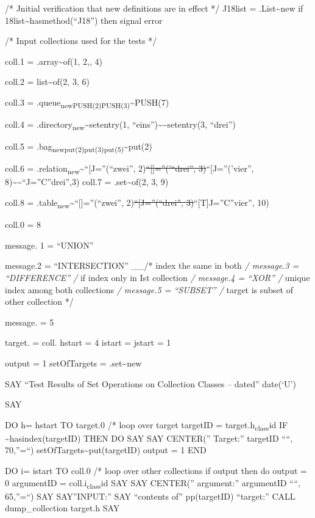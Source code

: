 /* Jnitial verification that new definitions are in effect */ J18list =
.List\textasciitilde new if \J18list\textasciitilde hasmethod(``J18'')
then signal error

/* Input collections used for the tests */

coll.1 = .array\textasciitilde of(1, 2,, 4)

coll.2 = list\textasciitilde of(2, 3, 6)

coll.3 = .queue\textsubscript{newPUSH(2)PUSH(3)}\textasciitilde PUSH(7)

coll.4 = .directory\textsubscript{new}\textasciitilde setentry(1,
``eins'')\textasciitilde\textasciitilde setentry(3, ``drei'')

coll.5 = .bag\textsubscript{newput(2)put(3)put(5)}\textasciitilde put(2)

coll.6 =
.relation\textsubscript{new}\textasciitilde{}``{[}J=''(``zwei'',
2)\st{``{[}{]}=''('``drei'', 3)}``{[}J=''('vier'',
8)\textasciitilde\textasciitilde{}``J=''C''drei'',3) coll.7 =
.set\textasciitilde of(2, 3, 9)

coll.8 = .table\textsubscript{new}\textasciitilde{}``{[}{]}=''(``zwei'',
2)\st{``{[}J=''(``drei'', 3)}``{[}T{]}J=''C''vier'', 10)

coll.0 = 8

message. 1 = ``UNION''

message.2 = ``INTERSECTION'' \_\_/* index the same in both \emph{/
message.3 = ``DIFFERENCE'' /} if index only in Ist collection \emph{/
message.4 = ``XOR'' /} unique index among both collections \emph{/
message.5 = ``SUBSET'' /} target is subset of other collection */

message. = 5

target. = coll. hstart = 4 istart = \textbar{} jstart = 1

output = 1 setOfTargets = .set\textasciitilde new

SAY ``Test Results of Set Operations on Collection Classes -- dated''
date(`U')

SAY

DO h= hstart TO target.0 /* loop over target targetID =
target.h\textsubscript{class}id IF
\setOfTargets\textasciitilde hasindex(targetID) THEN DO SAY SAY
CENTER('' Target:'' targetID ````, 70,''=``)
setOfTargets\textasciitilde put(targetID) output = 1 END

DO i= istart TO coll.0 /* loop over other collections if output then do
output = 0 argumentID = coll.i\textsubscript{class}id SAY SAY CENTER(''
argument:'' argumentID ````, 65,''=``) SAY SAY''INPUT:'' SAY ``contents
of'' pp(targetID) ``target:'' CALL dump\_collection target.h SAY

